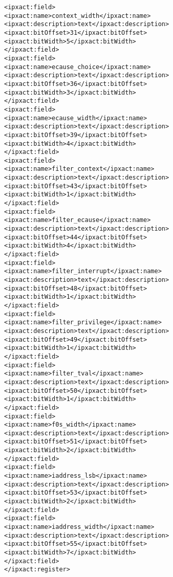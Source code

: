 \begin{alltt}
               <ipxact:field>
                  <ipxact:name>context_width</ipxact:name>
                  <ipxact:description>text</ipxact:description>
                  <ipxact:bitOffset>31</ipxact:bitOffset>
                  <ipxact:bitWidth>5</ipxact:bitWidth>
               </ipxact:field>
               <ipxact:field>
                  <ipxact:name>ecause_choice</ipxact:name>
                  <ipxact:description>text</ipxact:description>
                  <ipxact:bitOffset>36</ipxact:bitOffset>
                  <ipxact:bitWidth>3</ipxact:bitWidth>
               </ipxact:field>
               <ipxact:field>
                  <ipxact:name>ecause_width</ipxact:name>
                  <ipxact:description>text</ipxact:description>
                  <ipxact:bitOffset>39</ipxact:bitOffset>
                  <ipxact:bitWidth>4</ipxact:bitWidth>
               </ipxact:field>
               <ipxact:field>
                  <ipxact:name>filter_context</ipxact:name>
                  <ipxact:description>text</ipxact:description>
                  <ipxact:bitOffset>43</ipxact:bitOffset>
                  <ipxact:bitWidth>1</ipxact:bitWidth>
               </ipxact:field>
               <ipxact:field>
                  <ipxact:name>filter_ecause</ipxact:name>
                  <ipxact:description>text</ipxact:description>
                  <ipxact:bitOffset>44</ipxact:bitOffset>
                  <ipxact:bitWidth>4</ipxact:bitWidth>
               </ipxact:field>
               <ipxact:field>
                  <ipxact:name>filter_interrupt</ipxact:name>
                  <ipxact:description>text</ipxact:description>
                  <ipxact:bitOffset>48</ipxact:bitOffset>
                  <ipxact:bitWidth>1</ipxact:bitWidth>
               </ipxact:field>
               <ipxact:field>
                  <ipxact:name>filter_privilege</ipxact:name>
                  <ipxact:description>text</ipxact:description>
                  <ipxact:bitOffset>49</ipxact:bitOffset>
                  <ipxact:bitWidth>1</ipxact:bitWidth>
               </ipxact:field>
               <ipxact:field>
                  <ipxact:name>filter_tval</ipxact:name>
                  <ipxact:description>text</ipxact:description>
                  <ipxact:bitOffset>50</ipxact:bitOffset>
                  <ipxact:bitWidth>1</ipxact:bitWidth>
               </ipxact:field>
               <ipxact:field>
                  <ipxact:name>f0s_width</ipxact:name>
                  <ipxact:description>text</ipxact:description>
                  <ipxact:bitOffset>51</ipxact:bitOffset>
                  <ipxact:bitWidth>2</ipxact:bitWidth>
               </ipxact:field>
               <ipxact:field>
                  <ipxact:name>iaddress_lsb</ipxact:name>
                  <ipxact:description>text</ipxact:description>
                  <ipxact:bitOffset>53</ipxact:bitOffset>
                  <ipxact:bitWidth>2</ipxact:bitWidth>
               </ipxact:field>
               <ipxact:field>
                  <ipxact:name>iaddress_width</ipxact:name>
                  <ipxact:description>text</ipxact:description>
                  <ipxact:bitOffset>55</ipxact:bitOffset>
                  <ipxact:bitWidth>7</ipxact:bitWidth>
               </ipxact:field>
            </ipxact:register>



\end{alltt}

